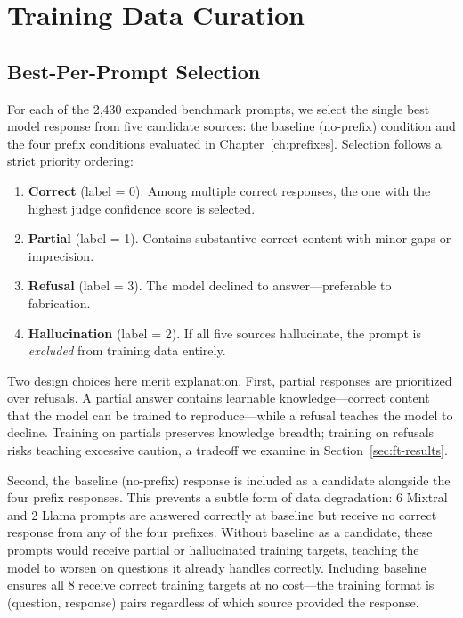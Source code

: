 \section{Training Data Curation}
\label{sec:training-curation}

\subsection{Best-Per-Prompt Selection}
\label{sec:best-per-prompt}

For each of the 2,430 expanded benchmark prompts, we select the single best model response from five candidate sources: the baseline (no-prefix) condition and the four prefix conditions evaluated in Chapter~\ref{ch:prefixes}. Selection follows a strict priority ordering:

\begin{enumerate}
    \item \textbf{Correct} (label = 0). Among multiple correct responses, the one with the highest judge confidence score is selected.
    \item \textbf{Partial} (label = 1). Contains substantive correct content with minor gaps or imprecision.
    \item \textbf{Refusal} (label = 3). The model declined to answer---preferable to fabrication.
    \item \textbf{Hallucination} (label = 2). If all five sources hallucinate, the prompt is \emph{excluded} from training data entirely.
\end{enumerate}

Two design choices here merit explanation. First, partial responses are prioritized over refusals. A partial answer contains learnable knowledge---correct content that the model can be trained to reproduce---while a refusal teaches the model to decline. Training on partials preserves knowledge breadth; training on refusals risks teaching excessive caution, a tradeoff we examine in Section~\ref{sec:ft-results}.

Second, the baseline (no-prefix) response is included as a candidate alongside the four prefix responses. This prevents a subtle form of data degradation: 6 Mixtral and 2 Llama prompts are answered correctly at baseline but receive no correct response from any of the four prefixes. Without baseline as a candidate, these prompts would receive partial or hallucinated training targets, teaching the model to worsen on questions it already handles correctly. Including baseline ensures all 8 receive correct training targets at no cost---the training format is (question, response) pairs regardless of which source provided the response.

